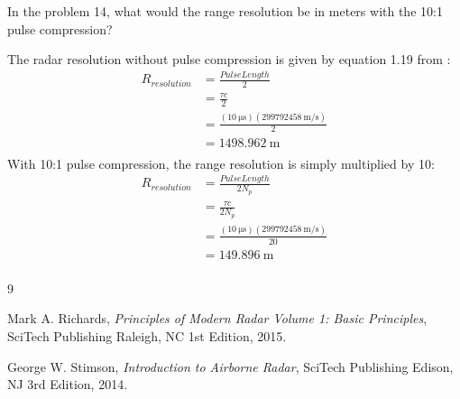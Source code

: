 \documentclass[12pt]{article}
\newenvironment{exercise}[2][Exercise]{\begin{trivlist}
    \item[\hskip \labelsep {\bfseries #1}\hskip \labelsep {\bfseries #2.}]}{\end{trivlist}}
\begin{document}
      \begin{exercise}{15}
      In the problem 14, what would the range resolution be in meters with the 10:1 pulse compression?      

      The radar resolution without pulse compression is given by equation 1.19 from \cite[p.~29]{POMR}:
      \begin{align*}
      R_{resolution} & = \frac{PulseLength}{2}\\
      & = \frac{ \tau c }{2}\\
      & = \frac{ (\SI{10}{\us}) (\SI{299792458}{\meter\per\second}) }{2}\\
      & = \SI{1498.962}{\meter}\\
      \end{align*}
      With 10:1 pulse compression, the range resolution is simply multiplied by 10:
      \begin{align*}
      R_{resolution} & = \frac{PulseLength}{2 N_{p}}\\
      & = \frac{  \tau c }{2 N_{p}}\\
      & = \frac{ (\SI{10}{\us}) (\SI{299792458}{\meter\per\second}) }{20}\\
      & = \SI{149.896}{\meter}\\
      \end{align*}
      \end{exercise}

      \begin{thebibliography}{9}

        Mark A. Richards,
        \emph{Principles of Modern Radar Volume 1: Basic Principles},
        SciTech Publishing Raleigh, NC
        1st Edition,
        2015.

        George W. Stimson,
        \emph{Introduction to Airborne Radar},
        SciTech Publishing Edison, NJ
        3rd Edition,
        2014.

      \end{thebibliography}

       
       
\end{document}
